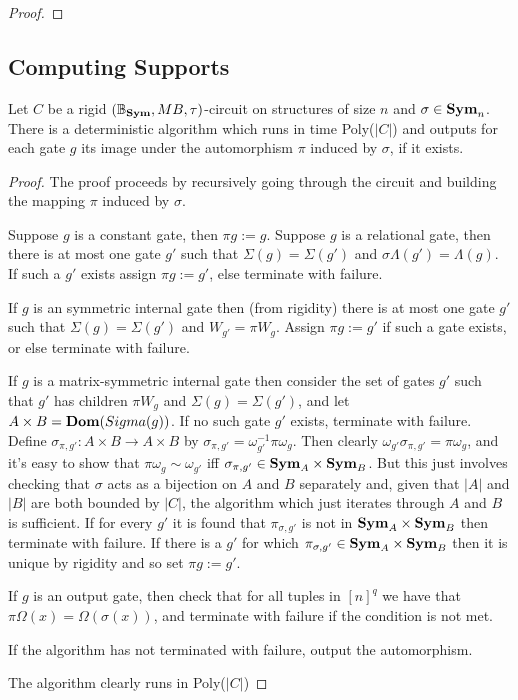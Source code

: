 \documentclass[../paper.tex]{subfiles}
\begin{document}
  \begin{proof}
  
  \end{proof}

  \subsection{Computing Supports}
  
 \begin{lem}
   Let $C$ be a rigid $(\mathbb{B}_{\text{\textbf{Sym}}}, MB, \tau)$-circuit on structures of size $n$ and
   $\sigma \in \text{\textbf{Sym}}_n$. There is a deterministic algorithm which runs in time
   Poly($\vert C \vert$) and outputs for each gate $g$ its image under the
   automorphism $\pi$ induced by $\sigma$, if it exists.
   \label{lem:computing-supports}
 \end{lem}
 \begin{proof}
   The proof proceeds by recursively going through the circuit and building the
   mapping $\pi$ induced by $\sigma$.

   Suppose $g$ is a constant gate, then $\pi g := g$. Suppose $g$ is a
   relational gate, then there is at most one gate $g'$ such that $\Sigma (g) =
   \Sigma (g')$ and $\sigma\Lambda (g') = \Lambda (g)$. If such a $g'$ exists
   assign $\pi g := g'$, else terminate with failure.

   If $g$ is an symmetric internal gate then (from rigidity) there is at most
   one gate $g'$ such that $\Sigma (g) = \Sigma(g')$ and $W_{g'} = \pi W_g$.
   Assign $\pi g := g'$ if such a gate exists, or else terminate with failure.

   If $g$ is a matrix-symmetric internal gate then consider the set of gates
   $g'$ such that $g'$ has children $\pi W_g$ and $\Sigma(g) = \Sigma(g')$, and
   let $A \times B = \text{\textbf{Dom}} (Sigma(g))$. If no such gate $g'$ exists, terminate
   with failure. Define $\sigma_{\pi, g'}:A \times B \rightarrow A \times B$ by
   $\sigma_{\pi, g'} = \omega^{-1}_{g'} \pi \omega_{g}$. Then clearly
   $\omega_{g'} \sigma_{\pi, g'} = \pi \omega_{g}$, and it's easy to show that
   $\pi \omega_g \sim \omega_{g'}$ iff $\sigma_{\pi,g'} \in \text{\textbf{Sym}}_A \times
   \text{\textbf{Sym}}_B$. But this just involves checking that $\sigma$ acts as a bijection on
   $A$ and $B$ separately and, given that $\vert A \vert$ and $\vert B \vert$
   are both bounded by $\vert C \vert$, the algorithm which just iterates
   through $A$ and $B$ is sufficient. If for every $g'$ it is found that
   $\pi_{\sigma,g'}$ is not in $\text{\textbf{Sym}}_A \times \text{\textbf{Sym}}_B$ then terminate with
   failure. If there is a $g'$ for which $\pi_{\sigma, g'} \in \text{\textbf{Sym}}_A \times
   \text{\textbf{Sym}}_B$ then it is unique by rigidity and so set $\pi g := g'$.

   If $g$ is an output gate, then check that for all tuples in $[n]^{q}$ we have
   that $\pi \Omega (x) = \Omega (\sigma (x))$, and terminate with failure if
   the condition is not met.

   If the algorithm has not terminated with failure, output the automorphism.

   The algorithm clearly runs in Poly($\vert C \vert$)
 \end{proof}
\end{document}
